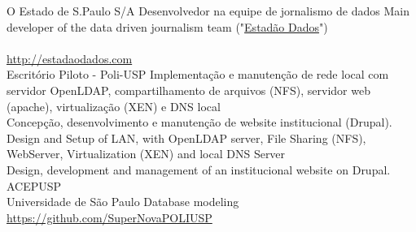 \documentclass[]{friggeri-cv}
\begin{document}
%
%
\begin{entrylist}
  \entry
    {}
    {}
    {O Estado de S.Paulo S/A}
    {%
        {Desenvolvedor na equipe de jornalismo de dados}%
        {Main developer of the data driven journalism team}
        ("\href{http://estadaodados.com}{Estadão Dados}")\\
     \\
     \href{http://estadaodados.com}{http://estadaodados.com}\\}
   \entry
    {}
    {}
    {Escritório Piloto - Poli-USP}
    {%
        {Implementação e manutenção de rede local com servidor OpenLDAP, \nohyphens{compartilhamento} de arquivos (NFS), servidor web (apache), virtualização (XEN) e DNS local\\
        Concepção, desenvolvimento e manutenção de website institucional (Drupal).\\}%
        {Design and Setup of LAN, with OpenLDAP server, File Sharing (NFS), WebServer, Virtualization (XEN) and local DNS Server\\
     Design, development and management of an institucional website on Drupal.\\}
    }
   \entry
    {}
    {}
    {ACEPUSP}
    {\\}
   \entry
    {}
    {}
    {Universidade de São Paulo}
    {%
    {Database modeling}\\%
    \href{https://github.com/SuperNovaPOLIUSP}{https://github.com/SuperNovaPOLIUSP}\\}
   \entry
    {}

\end{entrylist}
\end{document}
